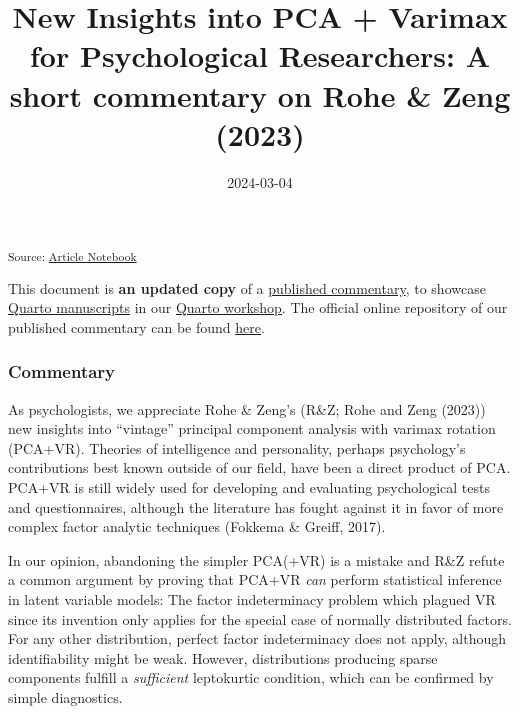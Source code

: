 \documentclass[
  jou,
  longtable,
  colorlinks=true,linkcolor=blue,citecolor=blue,urlcolor=blue]{apa7}
\title{New Insights into PCA + Varimax for Psychological Researchers: A
short commentary on Rohe \& Zeng (2023)}
\date{2024-03-04}
\begin{document}
\maketitle
\setcounter{secnumdepth}{-\maxdimen} %

\setlength\LTleft{0pt}


\textsubscript{Source:
\href{https://FlorianPargent.github.io/myquartomanuscript/index.qmd.html}{Article
Notebook}}

\begin{tcolorbox}[enhanced jigsaw, coltitle=black, colbacktitle=quarto-callout-important-color!10!white, opacitybacktitle=0.6, left=2mm, colback=white, colframe=quarto-callout-important-color-frame, bottomrule=.15mm, toptitle=1mm, toprule=.15mm, breakable, leftrule=.75mm, title=\textcolor{quarto-callout-important-color}{\faExclamation}\hspace{0.5em}{Important}, opacityback=0, bottomtitle=1mm, titlerule=0mm, arc=.35mm, rightrule=.15mm]

This document is \textbf{an updated copy} of a
\href{https://doi.org/10.1093/jrsssb/qkad054}{published commentary}, to
showcase \href{https://quarto.org/docs/manuscripts/}{Quarto manuscripts}
in our \href{https://florianpargent.github.io/Quarto_LMU_OSC/}{Quarto
workshop}. The official online repository of our published commentary
can be found \href{https://osf.io/5symf/}{here}.

\end{tcolorbox}

\subsubsection{Commentary}\label{commentary}

As psychologists, we appreciate Rohe \& Zeng's (R\&Z; Rohe and Zeng
(2023)) new insights into ``vintage'' principal component analysis with
varimax rotation (PCA+VR). Theories of intelligence and personality,
perhaps psychology's contributions best known outside of our field, have
been a direct product of PCA. PCA+VR is still widely used for developing
and evaluating psychological tests and questionnaires, although the
literature has fought against it in favor of more complex factor
analytic techniques (Fokkema \& Greiff, 2017).

In our opinion, abandoning the simpler PCA(+VR) is a mistake and R\&Z
refute a common argument by proving that PCA+VR \emph{can} perform
statistical inference in latent variable models: The factor
indeterminacy problem which plagued VR since its invention only applies
for the special case of normally distributed factors. For any other
distribution, perfect factor indeterminacy does not apply, although
identifiability might be weak. However, distributions producing sparse
components fulfill a \emph{sufficient} leptokurtic condition, which can
be confirmed by simple diagnostics.
\end{document}
